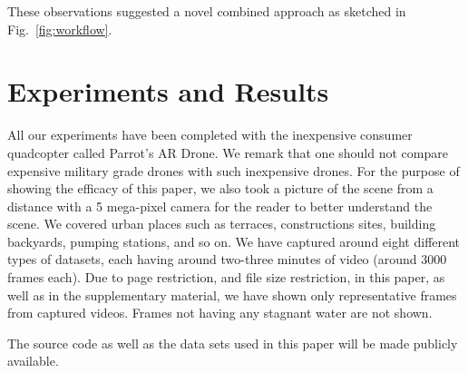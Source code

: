 \documentclass[times,10pt,twocolumn]{article}
\begin{document}
These observations suggested a novel combined approach as sketched
in Fig.~\ref{fig:workflow}.






\section{Experiments and Results}

All our experiments have been completed with the inexpensive consumer
quadcopter called Parrot's AR Drone. We remark that one should not
compare expensive military grade drones with such inexpensive drones.
For the purpose of showing the efficacy of this paper, we also took a
picture of the scene from a distance with a 5 mega-pixel camera for
the reader to better understand the scene.  We covered urban places
such as terraces, constructions sites, building backyards,
pumping stations, and so on.  We have captured around eight different
types of datasets, each having around two-three minutes of video
(around 3000 frames each). Due to page restriction, and file size
restriction, in this paper, as well as in the
supplementary material, we have shown only representative frames from
captured videos. Frames not having any stagnant water are not shown. 

The source code as well as the data sets used in this paper will be
made publicly available.
\end{document}
